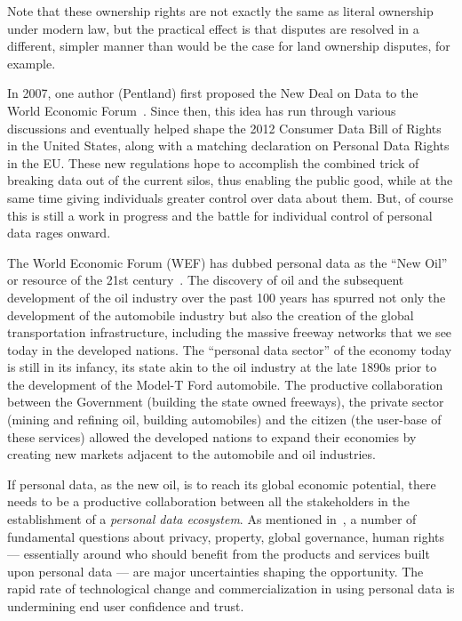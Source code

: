 Note that these ownership rights are not exactly the same as literal ownership under modern law, but the practical effect is that disputes are resolved in a different, simpler manner than would be the case for land ownership disputes, for example.

In 2007, one author (Pentland) first proposed the New Deal on Data to the World Economic Forum~\cite{WEF2011}. 
Since then, this idea has run through various discussions and eventually helped shape the 2012 Consumer Data Bill of Rights in the United States, along with a matching declaration on Personal Data Rights in the EU.
These new regulations hope to accomplish the combined trick of breaking data out of the current silos, thus enabling the public good, while at the same time giving individuals greater control over data about them.
But, of course this is still a work in progress and the battle for individual control of personal data rages onward.


The World Economic Forum (WEF) has dubbed personal data as the ``New Oil'' or resource of the 21st century~\cite{WEF2011}.
The discovery of oil and the subsequent development of the oil industry over the past 100 years has spurred not only the development of the automobile industry but also the creation of the global transportation infrastructure, including the massive freeway networks that we see today in the developed nations.
The ``personal data sector'' of the economy today is still in its infancy, its state akin to the oil industry at the late 1890s prior to the development of the Model-T Ford automobile.
The productive collaboration between the Government (building the state owned freeways), the private sector (mining and refining oil, building automobiles) and the citizen (the user-base of these services) allowed the developed nations to expand their economies by creating new markets adjacent to the automobile and oil industries.

If personal data, as the new oil, is to reach  its global economic potential, there needs to be a productive collaboration between all the stakeholders in the establishment of a {\em personal data ecosystem}.
As mentioned in~\cite{WEF2011}, a number of fundamental questions about privacy, property, 
global governance, human rights --- essentially around who should benefit from the products and services built upon personal data --- are major uncertainties shaping the opportunity.
The rapid rate of technological change and commercialization in using personal data is undermining end user confidence and trust.

